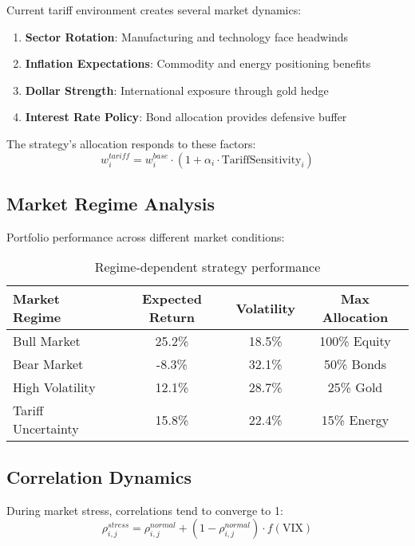\documentclass[onecolumn,11pt]{IEEEtran}
\begin{document}
Current tariff environment creates several market dynamics:

\begin{enumerate}
    \item \textbf{Sector Rotation}: Manufacturing and technology face headwinds
    \item \textbf{Inflation Expectations}: Commodity and energy positioning benefits
    \item \textbf{Dollar Strength}: International exposure through gold hedge
    \item \textbf{Interest Rate Policy}: Bond allocation provides defensive buffer
\end{enumerate}

The strategy's allocation responds to these factors:
\begin{equation}
w_i^{tariff} = w_i^{base} \cdot (1 + \alpha_i \cdot \text{TariffSensitivity}_i)
\end{equation}

\subsection{Market Regime Analysis}

Portfolio performance across different market conditions:

\begin{table}[h]
\centering
\begin{tabular}{lccc}
\toprule
Market Regime & Expected Return & Volatility & Max Allocation \\
\midrule
Bull Market & 25.2\% & 18.5\% & 100\% Equity \\
Bear Market & -8.3\% & 32.1\% & 50\% Bonds \\
High Volatility & 12.1\% & 28.7\% & 25\% Gold \\
Tariff Uncertainty & 15.8\% & 22.4\% & 15\% Energy \\
\bottomrule
\end{tabular}
\caption{Regime-dependent strategy performance}
\end{table}

\subsection{Correlation Dynamics}

During market stress, correlations tend to converge to 1:
\begin{equation}
\rho_{i,j}^{stress} = \rho_{i,j}^{normal} + (1 - \rho_{i,j}^{normal}) \cdot f(\text{VIX})
\end{equation}
\end{document}

